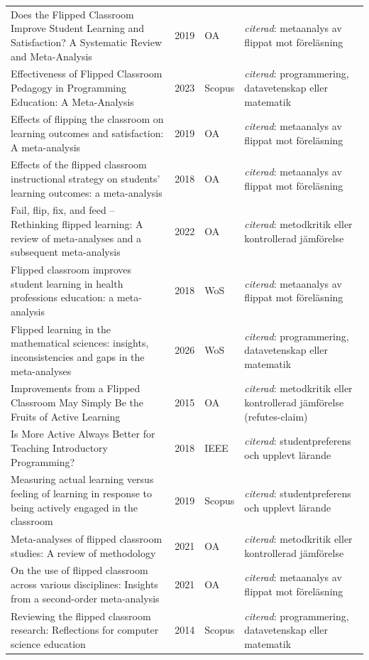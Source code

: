 \begin{longtable}{@{}%
  >{\raggedright\arraybackslash}p{}c%
  >{\raggedright\arraybackslash}p{}%
  >{\raggedright\arraybackslash}p{}@{}}
Does the Flipped Classroom Improve Student Learning and Satisfaction? A Systematic Review and Meta-Analysis & 2019 & OA & \emph{citerad}: metaanalys av flippat mot föreläsning \\
Effectiveness of Flipped Classroom Pedagogy in Programming Education: A Meta-Analysis & 2023 & Scopus & \emph{citerad}: programmering, datavetenskap eller matematik \\
Effects of flipping the classroom on learning outcomes and satisfaction: A meta-analysis & 2019 & OA & \emph{citerad}: metaanalys av flippat mot föreläsning \\
Effects of the flipped classroom instructional strategy on students' learning outcomes: a meta-analysis & 2018 & OA & \emph{citerad}: metaanalys av flippat mot föreläsning \\
Fail, flip, fix, and feed -- Rethinking flipped learning: A review of meta-analyses and a subsequent meta-analysis & 2022 & OA & \emph{citerad}: metodkritik eller kontrollerad jämförelse \\
Flipped classroom improves student learning in health professions education: a meta-analysis & 2018 & WoS & \emph{citerad}: metaanalys av flippat mot föreläsning \\
Flipped learning in the mathematical sciences: insights, inconsistencies and gaps in the meta-analyses & 2026 & WoS & \emph{citerad}: programmering, datavetenskap eller matematik \\
Improvements from a Flipped Classroom May Simply Be the Fruits of Active Learning & 2015 & OA & \emph{citerad}: metodkritik eller kontrollerad jämförelse (refutes-claim) \\
Is More Active Always Better for Teaching Introductory Programming? & 2018 & IEEE & \emph{citerad}: studentpreferens och upplevt lärande \\
Measuring actual learning versus feeling of learning in response to being actively engaged in the classroom & 2019 & Scopus & \emph{citerad}: studentpreferens och upplevt lärande \\
Meta-analyses of flipped classroom studies: A review of methodology & 2021 & OA & \emph{citerad}: metodkritik eller kontrollerad jämförelse \\
On the use of flipped classroom across various disciplines: Insights from a second-order meta-analysis & 2021 & OA & \emph{citerad}: metaanalys av flippat mot föreläsning \\
Reviewing the flipped classroom research: Reflections for computer science education & 2014 & Scopus & \emph{citerad}: programmering, datavetenskap eller matematik \\

\end{longtable}
